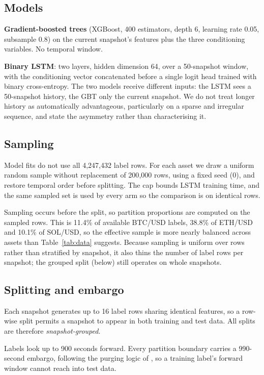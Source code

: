\documentclass[11pt]{article}
\begin{document}
\subsection{Models}

\textbf{Gradient-boosted trees} (XGBoost, 400 estimators, depth 6, learning
rate 0.05, subsample 0.8) on the current snapshot's features plus the three
conditioning variables. No temporal window.

\textbf{Binary LSTM}: two layers, hidden dimension 64, over a 50-snapshot
window, with the conditioning vector concatenated before a single logit head
trained with binary cross-entropy. The two models receive different inputs: the LSTM
sees a 50-snapshot history, the GBT only the current snapshot. We do not treat
longer history as automatically advantageous, particularly on a sparse and
irregular sequence, and state the asymmetry rather than characterising it.

\subsection{Sampling}
\label{sec:sampling}

Model fits do not use all 4{,}247{,}432 label rows. For each asset we draw a
uniform random sample without replacement of 200{,}000 rows, using a fixed seed
(0), and restore temporal order before splitting. The cap bounds LSTM training
time, and the same sampled set is used by every arm so the comparison is on
identical rows.

Sampling occurs before the split, so partition proportions are computed on the
sampled rows. This is 11.4\% of available BTC/USD labels, 38.8\% of ETH/USD and
10.1\% of SOL/USD, so the effective sample is more nearly balanced across assets
than Table~\ref{tab:data} suggests. Because sampling is uniform over rows rather
than stratified by snapshot, it also thins the number of label rows per
snapshot; the grouped split (below) still operates on whole snapshots.

\subsection{Splitting and embargo}
\label{sec:split}

Each snapshot generates up to 16 label rows sharing identical features, so a
row-wise split permits a snapshot to appear in both training and test data. All
splits are therefore \emph{snapshot-grouped}.

Labels look up to 900 seconds forward. Every partition boundary carries a
990-second embargo, following the purging logic of \citet{lopezdeprado2018}, so
a training label's forward window cannot reach into test data.
\end{document}
